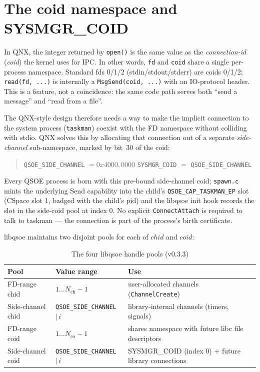 \section{The coid namespace and SYSMGR\_COID}
\label{sec:coid-namespace}

In QNX, the integer returned by \texttt{open()} is the same value as
the \emph{connection-id} (\emph{coid}) the kernel uses for IPC.  In
other words, \texttt{fd} and \texttt{coid} share a single per-process
namespace.  Standard fds 0/1/2 (stdin/stdout/stderr) are coids 0/1/2;
\texttt{read(fd, ...)} is internally a \texttt{MsgSend(coid, ...)} with
an IO-protocol header.  This is a feature, not a coincidence: the same
code path serves both ``send a message'' and ``read from a file''.

The QNX-style design therefore needs a way to make the implicit
connection to the system process (\texttt{taskman}) coexist with the
FD namespace without colliding with stdio.  QNX solves this by
allocating that connection out of a separate \emph{side-channel}
sub-namespace, marked by bit~30 of the coid:

\begin{quote}
\texttt{QSOE\_SIDE\_CHANNEL} $= 0x4000{,}0000$ \quad
\texttt{SYSMGR\_COID} $= $ \texttt{QSOE\_SIDE\_CHANNEL}
\end{quote}

Every QSOE process is born with this pre-bound side-channel coid;
\texttt{spawn.c} mints the underlying Send capability into the child's
\texttt{QSOE\_CAP\_TASKMAN\_EP} slot (CSpace slot 1, badged with the
child's pid) and the libqsoe init hook records the slot in the
side-coid pool at index 0.  No explicit \texttt{ConnectAttach} is
required to talk to taskman --- the connection is part of the process's
birth certificate.

libqsoe maintains two disjoint pools for each of $chid$ and $coid$:

\begin{table}[ht]
\centering
\small
\begin{tabular}{@{}lll@{}}
    \toprule
    \textbf{Pool}                & \textbf{Value range}                        & \textbf{Use} \\
    \midrule
    FD-range chid                & $1 \ldots N_{\mathrm{ch}}-1$                & user-allocated channels (\texttt{ChannelCreate}) \\
    Side-channel chid            & \texttt{QSOE\_SIDE\_CHANNEL} $|\, i$         & library-internal channels (timers, signals) \\
    FD-range coid                & $1 \ldots N_{\mathrm{co}}-1$                & shares namespace with future libc file descriptors \\
    Side-channel coid            & \texttt{QSOE\_SIDE\_CHANNEL} $|\, i$         & SYSMGR\_COID (index 0) + future library connections \\
    \bottomrule
\end{tabular}
\caption{The four libqsoe handle pools (v0.3.3)}
\label{tab:pools}
\end{table}

